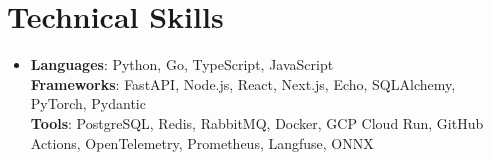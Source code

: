 \documentclass[letterpaper,11pt]{article}
\begin{document}
\section{Technical Skills}
\begin{itemize}[leftmargin=0.15in, label={}, topsep=0pt, itemsep=0pt, parsep=0pt, partopsep=0pt]
  \item{\fontsize{9.6pt}{10.0pt}\selectfont
   \textbf{Languages}{: Python, Go, TypeScript, JavaScript} \\
   \textbf{Frameworks}{: FastAPI, Node.js, React, Next.js, Echo, SQLAlchemy, PyTorch, Pydantic} \\
   \textbf{Tools}{: PostgreSQL, Redis, RabbitMQ, Docker, GCP Cloud Run, GitHub Actions, OpenTelemetry, Prometheus, Langfuse, ONNX} \\
  }
\end{itemize}
\end{document}
